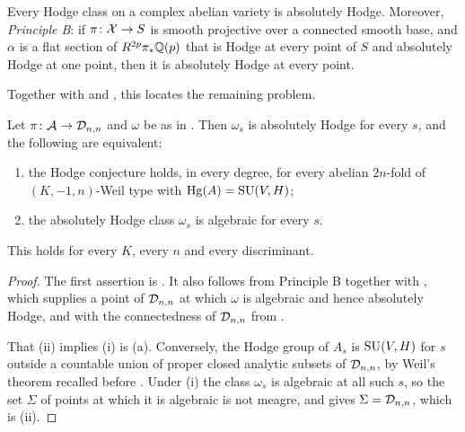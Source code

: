 \begin{theorem}\label{thm:deligneAH}
Every Hodge class on a complex abelian variety is absolutely Hodge. Moreover,
\emph{Principle B}: if $\pi\colon\mathcal{X}\to S$ is smooth projective over a
connected smooth base, and $\alpha$ is a flat section of $R^{2p}\pi_{*}\mathbb{Q}(p)$
that is Hodge at every point of $S$ and absolutely Hodge at one point, then it
is absolutely Hodge at every point.
\end{theorem}

Together with  and , this locates
the remaining problem.

\begin{corollary}\label{cor:exactform}
Let $\pi\colon\mathcal{A}\to\mathcal{D}_{n,n}$ and $\omega$ be as in . Then
$\omega_{s}$ is absolutely Hodge for every $s$, and the following are
equivalent:
\begin{enumerate}[label=\textup{(\roman*)},nosep]
\item the Hodge conjecture holds, in every degree, for every abelian
  $2n$-fold of $(K,-1,n)$-Weil type with $\operatorname{Hg}(A)=\operatorname{SU}(V,H)$;
\item the absolutely Hodge class $\omega_{s}$ is algebraic for every $s$.
\end{enumerate}
This holds for every $K$, every $n$ and every discriminant.
\end{corollary}

\begin{proof}
The first assertion is . It also follows from Principle B
together with , which supplies a point of $\mathcal{D}_{n,n}$ at
which $\omega$ is algebraic and hence absolutely Hodge, and with the
connectedness of $\mathcal{D}_{n,n}$ from .

That (ii) implies (i) is (a). Conversely, the Hodge group
of $A_{s}$ is $\operatorname{SU}(V,H)$ for $s$ outside a countable union of proper closed
analytic subsets of $\mathcal{D}_{n,n}$, by Weil's theorem \cite{Weil77} recalled
before . Under (i) the class $\omega_{s}$ is algebraic at
all such $s$, so the set $\Sigma$ of points at which it is algebraic is not
meagre, and  gives $\Sigma=\mathcal{D}_{n,n}$, which is (ii).
\end{proof}
